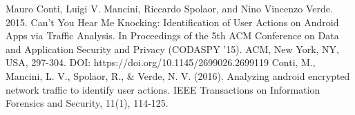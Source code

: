 \documentclass[a4paper,10pt]{scrartcl}
\begin{document}
\begin{thebibliography}{99}
Mauro Conti, Luigi V. Mancini, Riccardo Spolaor, and Nino Vincenzo Verde. 2015. Can't You Hear Me Knocking: Identification of User Actions on Android Apps via Traffic Analysis. In Proceedings of the 5th ACM Conference on Data and Application Security and Privacy (CODASPY '15). ACM, New York, NY, USA, 297-304. DOI: https://doi.org/10.1145/2699026.2699119
 Conti, M., Mancini, L. V., Spolaor, R., \& Verde, N. V. (2016). Analyzing android encrypted network traffic to identify user actions. IEEE Transactions on Information Forensics and Security, 11(1), 114-125.


\end{thebibliography}
\end{document}
